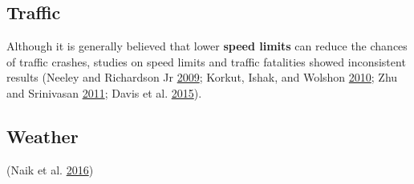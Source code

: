 \documentclass[12pt]{book}
\numberwithin{equation}{chapter}
\begin{document}
\hypertarget{traffic}{%
\subsection{Traffic}\label{traffic}}

Although it is generally believed that lower \textbf{speed limits} can reduce the chances of traffic crashes, studies on speed limits and traffic fatalities showed inconsistent results (Neeley and Richardson Jr \protect\hyperlink{ref-neeley2009effect}{2009}; Korkut, Ishak, and Wolshon \protect\hyperlink{ref-korkut2010freeway}{2010}; Zhu and Srinivasan \protect\hyperlink{ref-zhu2011comprehensive}{2011}; Davis et al. \protect\hyperlink{ref-davis2015longitudinal}{2015}).

\hypertarget{weather}{%
\subsection{Weather}\label{weather}}

(Naik et al. \protect\hyperlink{ref-naik2016weather}{2016})
\end{document}
